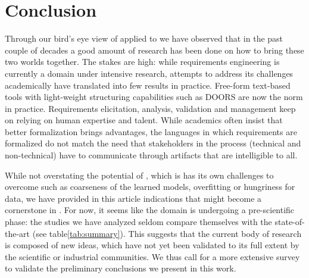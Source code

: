 \section{Conclusion}
\label{sec:conclusion}

Through our bird's eye view of \ML applied to \RE we have observed that in the
past couple of decades a good amount of research has been done on how to bring
these two worlds together. The stakes are high: while requirements engineering
is currently a domain under intensive research, attempts to address its
challenges academically have translated into few results in practice. Free-form
text-based tools with light-weight structuring capabilities such as DOORS are
now the norm in practice. Requirements elicitation, analysis, validation and
management keep on relying on human expertise and talent. While academics often insist that
better formalization brings advantages, the languages in which requirements are
formalized do not match the need that stakeholders in the \RE process
(technical and non-technical) have to communicate through artifacts that are
intelligible to all.

While not overstating the potential of \ML, which is has its own challenges to
overcome such as coarseness of the learned models, overfitting or hungriness for
data, we have provided in this article indications that \ML might become a
cornerstone in \RE. For now, it seems like the domain is undergoing a
pre-scientific phase: the studies we have analyzed seldom compare themselves
with the state-of-the-art (see table\ref{tab:summary}). This suggests that the
current body of research is composed of new ideas, which have not yet been
validated to its full extent by the scientific or industrial communities. We
thus call for a more extensive survey to validate the preliminary conclusions we
present in this work.
